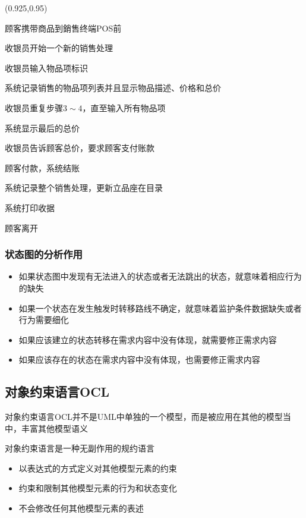 \begin{textblock}{0.33}(0.925,0.95)
{\kaishu \small
\begin{compactenum}[1.]
    \item 顾客携带商品到銷售终端POS前
    \item 收银员开始一个新的销售处理
    \item 收银员输入物品项标识
    \item 系统记录销售的物品项列表并且显示物品描述、价格和总价
\end{compactenum}
\vspace{-0.65em}
收银员重复步骤$3\sim 4$，直至输入所有物品项
\vspace{-0.6em}
\begin{compactenum}[1.]
    \setcounter{enumi}{4}
    \item 系统显示最后的总价
    \item 收银员告诉顾客总价，要求顾客支付账款
    \item 顾客付款，系统结账
    \item 系统记录整个销售处理，更新立品座在目录
    \item 系统打印收据
    \item 顾客离开
\end{compactenum}
}\end{textblock}

\subsubsection{状态图的分析作用}
\begin{itemize}
    \item 如果状态图中发现有无法进入的状态或者无法跳出的状态，就意味着相应行为的缺失
    \item 如果一个状态在发生触发时转移路线不确定，就意味着监护条件数据缺失或者行为需要细化
    \item 如果应该建立的状态转移在需求内容中没有体现，就需要修正需求内容
    \item 如果应该存在的状态在需求内容中没有体现，也需要修正需求内容
\end{itemize}

\subsection{对象约束语言OCL}
对象约束语言OCL并不是UML中单独的一个模型，而是被应用在其他的模型当中，丰富其他模型语义

对象约束语言是一种无副作用的规约语言
\vspace{-0.8em}
\begin{multicols}{2}
    \begin{itemize}
        \item 以表达式的方式定义对其他模型元素的约束
        \item 约束和限制其他模型元素的行为和状态变化
        \item 不会修改任何其他模型元素的表述
    \end{itemize}
\end{multicols}
\vspace{-1em}

